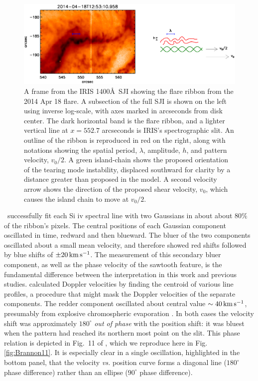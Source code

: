 \begin{figure}[htbp]
\centerline{\includegraphics[width=6.5in]{ParkerLongcope2017/sji_context}}
\caption{A frame from the IRIS 1400\AA\ SJI showing the flare ribbon from the 2014 Apr 18 flare.  A subsection of the full SJI is shown on the left using inverse log-scale, with axes marked in arcseconds from disk center.  The dark horizontal band is the flare ribbon, and a lighter vertical line at $x=552.7$ arcseconds is IRIS's spectrographic slit.  An outline of the ribbon is reproduced  in red on the right, along with notations showing the spatial period, $\lambda$, amplitude, $h$, and pattern velocity, $v_0/2$.  A green island-chain shows the proposed orientation of the tearing mode instability, displaced southward for clarity by a distance greater than proposed in the model.  A second velocity arrow shows the direction of the proposed shear velocity, $v_0$, which causes the island chain to move at $v_0/2$.}
\label{fig:SJI}
\end{figure}

\BLQ\ successfully fit  each Si {\sc iv} spectral line with two Gaussians in about about $80\%$ of the ribbon's pixels.  The central positions of each Gaussian component oscillated in time, redward and then blueward. The bluer of the two components oscillated about a small mean velocity, and therefore showed red shifts followed by blue shifts of 
$\pm 20\,{\rm km\, s^{-1}}$. The measurement of this secondary bluer component, as well as the phase velocity of the sawtooth feature, is the fundamental difference between the interpretation in this work and previous studies. \citet{Brosius2015} calculated Doppler velocities by finding the centroid of various line profiles, a procedure that might mask the Doppler velocities of the separate components. The redder component oscillated about central value $\sim 40\,{\rm km\, s^{-1}}$, presumably from explosive chromospheric evaporation \citep{Fisher1985b}.  In both cases the velocity shift was approximately $180^{\circ}$  {\em out of phase} with the position shift: it was bluest when the pattern had reached its northern most point on the slit.  This phase relation is depicted in Fig.\ 11 of \BLQ, which we reproduce here in Fig. \ref{fig:Brannon11}.  It is especially clear in a single oscillation, highlighted in the bottom panel, that the velocity {\em vs.} position curve forms a diagonal line ($180^{\circ}$ phase difference) rather than an ellipse ($90^{\circ}$ phase difference).

